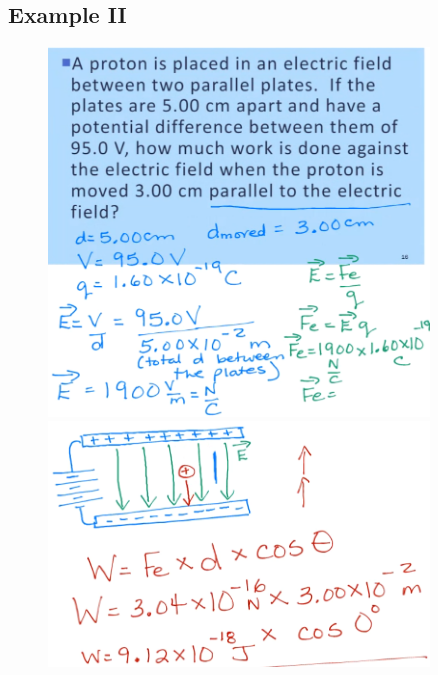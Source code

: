 \documentclass[a4paper,12pt]{article}
\begin{document}
\subsection{Example II}
\begin{figure}[H]
    \centering
    \includegraphics[width=0.9\textwidth]{workplate1}
    \includegraphics[width=0.9\textwidth]{workplate2}
\end{figure}

\pagebreak
\end{document}
